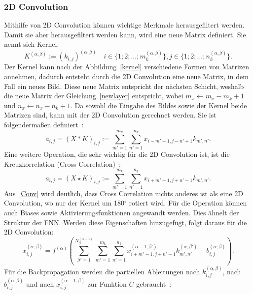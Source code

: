 \documentclass[11pt]{article}
\begin{document}
\subsubsection{2D Convolution}
Mithilfe von 2D Convolution können wichtige Merkmale herausgefiltert werden. Damit sie aber herausgefiltert werden kann, wird
eine neue Matrix definiert. Sie nennt sich Kernel:
\begin{equation}
    K^{(\alpha,\beta)}:={(k_{i,j})}^{(\alpha,\beta)} \quad i \in\{1;2;\ldots;m_{k}^{(\alpha,\beta)}\}, j \in\{1;2;\ldots;n_{k}^{(\alpha,\beta)}\}.
\end{equation}
Der Kernel kann nach der Abbildung~\ref{kernel} verschiedene Formen von Matrizen annehmen, dadurch entsteht durch die 2D Convolution eine neue Matrix, in dem Fall ein neues Bild.
Diese neue Matrix entspricht der nächsten Schicht, weshalb die neue Matrix der Gleichung~\ref{newlayer} entspricht, wobei $ m_x \leftarrow m_x - m_k + 1 $ und $ n_x \leftarrow n_x - n_k + 1 $.
Da sowohl die Eingabe des Bildes sowie der Kernel beide Matrizen sind, kann mit der 2D Convolution gerechnet werden. Sie ist
folgendermaßen definiert~\cite{16}:
\begin{equation}
    a_{i,j} = {(X \ast K)}_{i,j} := \sum_{m'=1}^{m_{k}} \sum_{n'=1}^{n_{k}} x_{i-m'+1,j-n'+1}k_{m',n'}. \label{Conv}
\end{equation}
Eine weitere Operation, die sehr wichtig für die 2D Convolution ist, ist die Kreuzkorrelation (Cross Correlation)~\cite{16}:
\begin{equation}
    a_{i,j} = {(X \star K)}_{i,j} := \sum_{m'=1}^{m_{k}} \sum_{n'=1}^{n_{k}} x_{i+m'-1,j+n'-1}k_{m',n'}.
\end{equation}
Aus~\eqref{Conv} wird deutlich, dass Cross Correlation nichts anderes ist als eine 2D Convolution, wo nur der Kernel um 180$^{\circ}$
rotiert wird. Für die Operation können auch Biases sowie Aktivierungsfunktionen angewandt werden. Dies ähnelt der Struktur der FNN.\@
Werden diese Eigenschaften hinzugefügt, folgt daraus für die 2D Convolution:
\begin{equation}
    x_{i,j}^{(\alpha,\beta)} = f^{(\alpha)}(\sum_{\beta'=1}^{N_{\beta}^{(\alpha-1)}} \sum_{m'=1}^{m_{k}} \sum_{n'=1}^{n_{k}} x_{i+m'-1,j+n'-1}^{(\alpha-1,\beta')}k_{m',n'}^{(\alpha,\beta')}+b_{i,j}^{(\alpha,\beta)}).
\end{equation}
Für die Backpropagation werden die partiellen Ableitungen nach $k_{i,j}^{(\alpha,\beta)}$, nach $b_{i,j}^{(\alpha,\beta)}$ und nach $x_{i,j}^{(\alpha-1,\beta)}$ zur Funktion $C$ gebraucht~\cite{16}:
\end{document}
